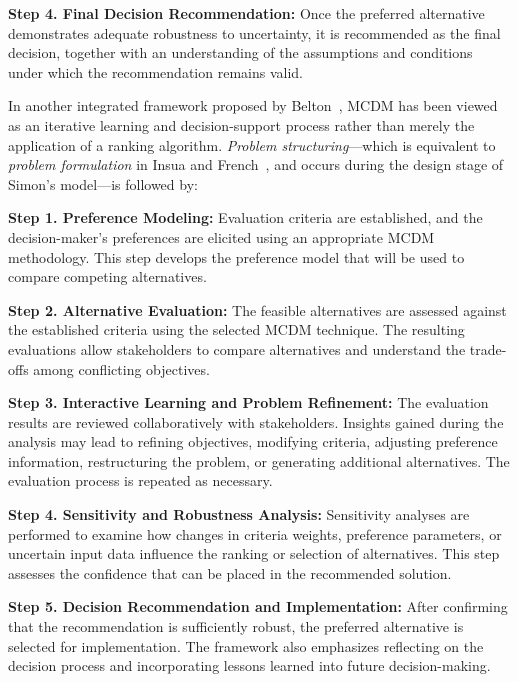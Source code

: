 \documentclass{sfuthesis}
\begin{document}
\textbf{Step 4. Final Decision Recommendation:} Once the preferred alternative demonstrates adequate robustness to uncertainty, it is recommended as the final decision, together with an understanding of the assumptions and conditions under which the recommendation remains valid.

In another integrated framework proposed by Belton~\cite{belton2002multiple}, MCDM has been viewed as an iterative learning and decision-support process rather than merely the application of a ranking algorithm. \textit{Problem structuring}—which is equivalent to \textit{problem formulation} in Insua and French~\cite{insua1991framework}, and occurs during the design stage of Simon's model—is followed by:\par
\textbf{Step 1. Preference Modeling:} Evaluation criteria are established, and the decision-maker's preferences are elicited using an appropriate MCDM methodology. This step develops the preference model that will be used to compare competing alternatives.

\textbf{Step 2. Alternative Evaluation:} The feasible alternatives are assessed against the established criteria using the selected MCDM technique. The resulting evaluations allow stakeholders to compare alternatives and understand the trade-offs among conflicting objectives.

\textbf{Step 3. Interactive Learning and Problem Refinement:} The evaluation results are reviewed collaboratively with stakeholders. Insights gained during the analysis may lead to refining objectives, modifying criteria, adjusting preference information, restructuring the problem, or generating additional alternatives. The evaluation process is repeated as necessary.

\textbf{Step 4. Sensitivity and Robustness Analysis:} Sensitivity analyses are performed to examine how changes in criteria weights, preference parameters, or uncertain input data influence the ranking or selection of alternatives. This step assesses the confidence that can be placed in the recommended solution.

\textbf{Step 5. Decision Recommendation and Implementation:} After confirming that the recommendation is sufficiently robust, the preferred alternative is selected for implementation. The framework also emphasizes reflecting on the decision process and incorporating lessons learned into future decision-making.
\end{document}
